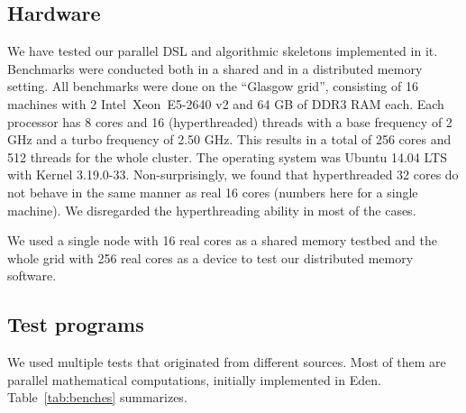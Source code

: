 \newcommand{\speedupdiffplot}[7]{
\begin{tikzpicture}
\begin{axis}[title={#1},
title style={align=center},
scale only axis, width=#7,
xlabel=Cores,
xtick distance=#4,
ytick distance=0.5,
ylabel=Absolute speedup difference,
ylabel near ticks,
grid=major,
legend entries={#2},
legend style={at={(0.99,0.99)},anchor=north east},
max space between ticks=50pt,
grid style={line width=.1pt, draw=gray!10},
major grid style={line width=.2pt,draw=gray!50},
xmin=-1,
xmax=#6]
#5
\end{axis}
\end{tikzpicture}
}

\subsection{Hardware}

We have tested our parallel DSL and algorithmic skeletons implemented
in it. Benchmarks were conducted both in a shared and in a distributed
memory setting. All benchmarks were done on the ``Glasgow grid'', consisting of
16 machines with 2 Intel\SymbReg~Xeon\SymbReg~E5-2640 v2 and 64 GB of DDR3 RAM each. Each processor has 8 cores and 16 (hyperthreaded) threads with a base frequency of 2 GHz and a turbo frequency of 2.50 GHz. This results in a total of 256 cores and 512 threads for the whole cluster. The operating system was Ubuntu 14.04 LTS with Kernel 3.19.0-33. Non-surprisingly, we found that hyperthreaded 32 cores do not behave in the same manner as real 16 cores (numbers here for a single machine). We disregarded the hyperthreading ability in most of the
cases.

We used a single node with 16 real cores as a shared memory testbed
and the whole grid with 256 real cores as a device to test our
distributed memory software.

\subsection{Test programs}

We used multiple tests that originated from different
sources. Most of them are parallel mathematical computations, initially
implemented in Eden. Table~\ref{tab:benches} summarizes.

